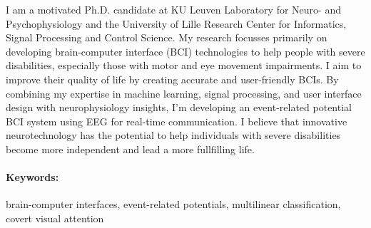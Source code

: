 \documentclass[10pt,a4paper]{article}
\begin{document}
%

I am a motivated Ph.D. candidate at KU Leuven Laboratory for Neuro- and Psychophysiology and the University of Lille Research Center for Informatics, Signal Processing and Control Science. My research focusses primarily on developing brain-computer interface (BCI) technologies to help people with severe disabilities, especially those with motor and eye movement impairments. I aim to improve their quality of life by creating accurate and user-friendly BCIs. By combining my expertise in machine learning, signal processing, and user interface design with neurophysiology insights, I'm developing an event-related potential BCI system using EEG for real-time communication. I believe that innovative neurotechnology has the potential to help individuals with severe disabilities become more independent and lead a more fullfilling life.

\paragraph{Keywords:} brain-computer interfaces, event-related
potentials, multilinear classification, covert visual attention
\end{document}
